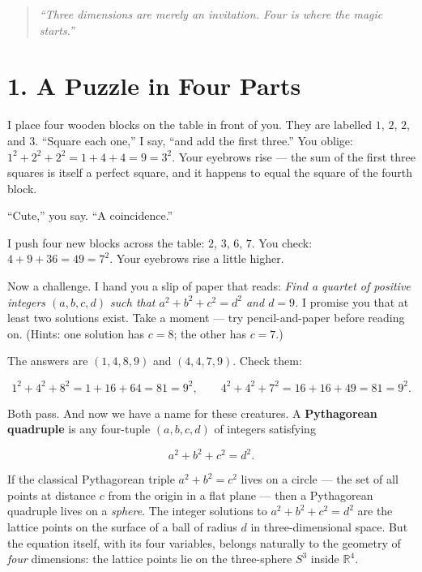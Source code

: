 

\begin{quote}
\emph{``Three dimensions are merely an invitation. Four is where the magic starts.''}
\end{quote}



\section{1. A Puzzle in Four Parts}\label{ch12-a-puzzle-in-four-parts}

I place four wooden blocks on the table in front of you. They are labelled \(1\), \(2\), \(2\), and \(3\). ``Square each one,'' I say, ``and add the first three.'' You oblige: \(1^2 + 2^2 + 2^2 = 1 + 4 + 4 = 9 = 3^2\). Your eyebrows rise --- the sum of the first three squares is itself a perfect square, and it happens to equal the square of the fourth block.

``Cute,'' you say. ``A coincidence.''

I push four new blocks across the table: \(2\), \(3\), \(6\), \(7\). You check: \(4 + 9 + 36 = 49 = 7^2\). Your eyebrows rise a little higher.

Now a challenge. I hand you a slip of paper that reads: \emph{Find a quartet of positive integers \((a, b, c, d)\) such that \(a^2 + b^2 + c^2 = d^2\) and \(d = 9\).} I promise you that at least two solutions exist. Take a moment --- try pencil-and-paper before reading on. (Hints: one solution has \(c = 8\); the other has \(c = 7\).)

The answers are \((1, 4, 8, 9)\) and \((4, 4, 7, 9)\). Check them:

\[1^2 + 4^2 + 8^2 = 1 + 16 + 64 = 81 = 9^2, \qquad 4^2 + 4^2 + 7^2 = 16 + 16 + 49 = 81 = 9^2.\]

Both pass. And now we have a name for these creatures. A \textbf{Pythagorean quadruple} is any four-tuple \((a, b, c, d)\) of integers satisfying

\[a^2 + b^2 + c^2 = d^2.\]

If the classical Pythagorean triple \(a^2 + b^2 = c^2\) lives on a circle --- the set of all points at distance \(c\) from the origin in a flat plane --- then a Pythagorean quadruple lives on a \emph{sphere}. The integer solutions to \(a^2 + b^2 + c^2 = d^2\) are the lattice points on the surface of a ball of radius \(d\) in three-dimensional space. But the equation itself, with its four variables, belongs naturally to the geometry of \emph{four} dimensions: the lattice points lie on the three-sphere \(S^3\) inside \(\mathbb{R}^4\).


